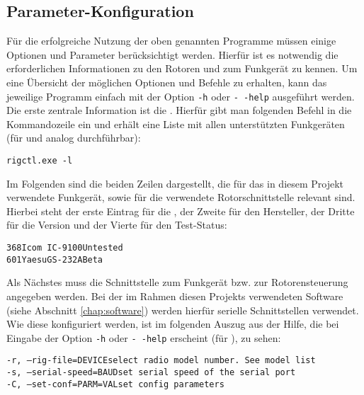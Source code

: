 \subsection{Parameter-Konfiguration}
\label{chap:hamlibconfig}

Für die erfolgreiche Nutzung der oben genannten Programme müssen einige Optionen und Parameter berücksichtigt werden. Hierfür ist es notwendig die erforderlichen Informationen zu den Rotoren und zum Funkgerät zu kennen. Um eine Übersicht der möglichen Optionen und Befehle zu erhalten, kann das jeweilige Programm einfach mit der Option \texttt{-h} oder \texttt{-\,-help} ausgeführt werden.\newpar
Die erste zentrale Information ist die . Hierfür gibt man folgenden Befehl in die Kommandozeile ein und erhält eine Liste mit allen unterstützten Funkgeräten (für  und  analog durchführbar):

\vspace{-1em}
\begin{shaded}
	\texttt{rigctl.exe -l}
\end{shaded}
\vspace{-1em}

Im Folgenden sind die beiden Zeilen dargestellt, die für das in diesem Projekt verwendete Funkgerät, sowie für die verwendete Rotorschnittstelle relevant sind. Hierbei steht der erste Eintrag für die , der Zweite für den Hersteller, der Dritte für die Version und der Vierte für den Test-Status:

\label{hamlibbackend}
\vspace{-1em}
\begin{shaded}
	\texttt{368\qquad Icom\qquad\ IC-9100\qquad Untested}\\%
	\texttt{601\qquad Yaesu\qquad GS-232A\qquad Beta}
\end{shaded}
\vspace{-1em}

Als Nächstes muss die Schnittstelle zum Funkgerät bzw. zur Rotorensteuerung angegeben werden. Bei der im Rahmen diesen Projekts verwendeten Software (siehe Abschnitt \ref{chap:software}) werden hierfür serielle Schnittstellen verwendet. Wie diese konfiguriert werden, ist im folgenden Auszug aus der Hilfe, die bei Eingabe der Option \texttt{-h} oder \texttt{-\,-help} erscheint (für ), zu sehen:

\vspace{-1em}
\begin{shaded}
	 \texttt{-r, --rig-file=DEVICE\qquad \qquad select radio model number. See model list} \\%
	 \texttt{-s, --serial-speed=BAUD\qquad\quad set serial speed of the serial port} \\%
	 \texttt{-C, --set-conf=PARM=VAL\qquad \quad set config parameters}
\end{shaded}
\vspace{-1em}

